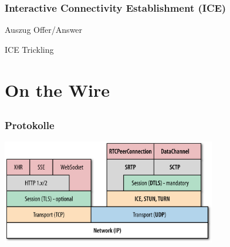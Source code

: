 \documentclass[12pt]{beamer}
\begin{document}

\begin{frame}
  \frametitle{Interactive Connectivity Establishment (ICE)}
  \pause
  
  \hfill \tiny Auszug Offer/Answer
  \vspace{15pt}
  \pause
  
  
  \hfill \tiny ICE Trickling
\end{frame}


\section{On the Wire}
\subsection{} 

\begin{frame}
  \frametitle{Protokolle}
  \centerline{\includegraphics[width=0.7\textwidth]{img/stack_oreilly.png}}
\end{frame}
\end{document}
